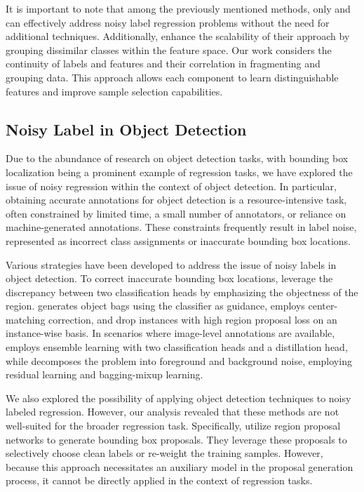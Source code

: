 \documentclass{article}
\theoremstyle{plain}
\theoremstyle{definition}
\theoremstyle{remark}
\begin{document}
It is important to note that among the previously mentioned methods, only \citet{yao22cmixup} and \citet{garg2020robust} can effectively address noisy label regression problems without the need for additional techniques. 
Additionally, \citet{wang22spr} enhance the scalability of their approach by grouping dissimilar classes within the feature space. 
Our work considers the continuity of labels and features and their correlation in fragmenting and grouping data. 
This approach allows each component to learn distinguishable features and improve sample selection capabilities.


\subsection{Noisy Label in Object Detection}\label{subsec:object_detection_related_works}
Due to the abundance of research on object detection tasks, with bounding box localization being a prominent example of regression tasks,
we have explored the issue of noisy regression within the context of object detection.
In particular, obtaining accurate annotations for object detection is a resource-intensive task, often constrained by limited time, a small number of annotators, or reliance on machine-generated annotations.
These constraints frequently result in label noise, represented as incorrect class assignments or inaccurate bounding box locations.

Various strategies have been developed to address the issue of noisy labels in object detection.
To correct inaccurate bounding box locations, \citet{li2020towards} leverage the discrepancy between two classification heads by emphasizing the objectness of the region.
\citet{liu2022robust} generates object bags using the classifier as guidance, \citet{mao2021noisy} employs center-matching correction, and \citet{schubert2023identifying} drop instances with high region proposal loss on an instance-wise basis.
In scenarios where image-level annotations are available, \citet{gao2018notercnn} employs ensemble learning with two classification heads and a distillation head,
while \citet{shen2020noise} decomposes the problem into foreground and background noise, employing residual learning and bagging-mixup learning.

We also explored the possibility of applying object detection techniques to noisy labeled regression.
However, our analysis revealed that these methods are not well-suited for the broader regression task.
Specifically, \citet{liu2022robust, schubert2023identifying, mao2021noisy} utilize region proposal networks to generate bounding box proposals.
They leverage these proposals to selectively choose clean labels or re-weight the training samples.
However, because this approach necessitates an auxiliary model in the proposal generation process, it cannot be directly applied in the context of regression tasks.
\end{document}
